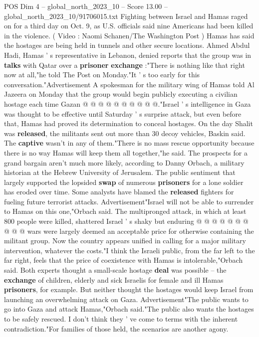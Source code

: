 \begin{textsample}{POS Dim 4 – global\_north\_2023\_10 – Score 13.00 – global\_north\_2023\_10/91706015.txt}
Fighting between Israel and Hamas raged on for a third day on Oct. 9, as U.S. officials said nine Americans had been killed in the violence. ( Video : Naomi Schanen/The Washington Post ) Hamas has said the hostages are being held in tunnels and other secure locations.
Ahmed Abdul Hadi, Hamas ' s representative in Lebanon, denied reports that the group was in \textbf{talks} with Qatar over a \textbf{prisoner} \textbf{exchange} :"There is nothing like that right now at all,"he told The Post on Monday."It ' s too early for this conversation."Advertisement A spokesman for the military wing of Hamas told Al Jazeera on Monday that the group would begin publicly executing a civilian hostage each time Gazan @ @ @ @ @ @ @ @ @ @."Israel ' s intelligence in Gaza was thought to be effective until Saturday ' s surprise attack, but even before that, Hamas had proved its determination to conceal hostages.
On the day Shalit was \textbf{released}, the militants sent out more than 30 decoy vehicles, Baskin said.
The \textbf{captive} wasn't in any of them."There is no mass rescue opportunity because there is no way Hamas will keep them all together,"he said.
The prospects for a grand bargain aren't much more likely, according to Danny Orbach, a military historian at the Hebrew University of Jerusalem.
The public sentiment that largely supported the lopsided \textbf{swap} of numerous \textbf{prisoners} for a lone soldier has eroded over time.
Some analysts have blamed the \textbf{released} fighters for fueling future terrorist attacks.
Advertisement"Israel will not be able to surrender to Hamas on this one,"Orbach said.
The multipronged attack, in which at least 800 people were killed, shattered Israel ' s shaky but enduring @ @ @ @ @ @ @ @ @ @ wars were largely deemed an acceptable price for otherwise containing the militant group.
Now the country appears unified in calling for a major military intervention, whatever the costs."I think the Israeli public, from the far left to the far right, feels that the price of coexistence with Hamas is intolerable,"Orbach said.
Both experts thought a small-scale hostage \textbf{deal} was possible -- the \textbf{exchange} of children, elderly and sick Israelis for female and ill Hamas \textbf{prisoners}, for example.
But neither thought the hostages would keep Israel from launching an overwhelming attack on Gaza.
Advertisement"The public wants to go into Gaza and attack Hamas,"Orbach said."The public also wants the hostages to be safely rescued.
I don't think they ' ve come to terms with the inherent contradiction."For families of those held, the scenarios are another agony.

\end{textsample}
